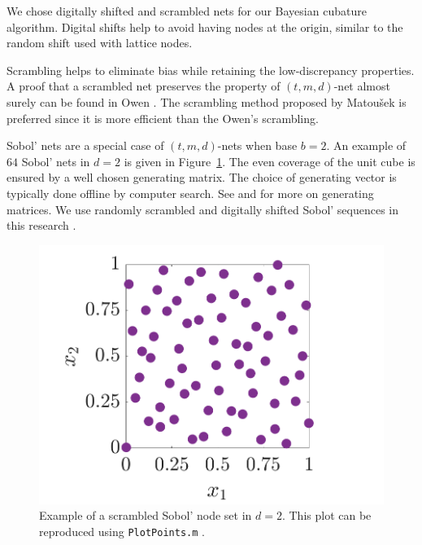 \documentclass{svjour3}                     %
\newcommand{\bm}[1]{\boldsymbol{#1}}
\newcommand{\vx}{\bm{x}}
\newcommand{\vz}{\bm{z}}
\newcommand{\code}[1]{\texttt{#1}}
\newcommand\figref{Figure~\ref}
\newcommand{\JRNote}[1]{{\textcolor{green}{JR: #1}}}
\begin{document}
We chose digitally shifted and scrambled nets \cite{HicYue00} for our Bayesian cubature algorithm. Digital shifts help to avoid having nodes at the origin, similar to the random shift used with lattice nodes.

Scrambling helps to eliminate bias while retaining the low-discrepancy properties.
A proof that a scrambled net preserves the property of $(t, m, d)$-net almost surely can be found in Owen \cite{Owe95}. The scrambling method proposed by Matou\v{s}ek \cite{Mat98} is preferred since it is more efficient than the Owen's scrambling.

Sobol' nets \cite{Sob76} are a special case of $(t,m, d)$-nets when base $b=2$. 
An example of $64$ Sobol' nets in $d=2$ is given in \figref{fig:sobol-fig}.  The even coverage of the unit cube is ensured by a well chosen generating matrix.  The choice of generating vector is typically done offline by computer search.  See \cite{KuoNuyens2016} and \cite{NuySoft} for more on generating matrices. We use randomly scrambled and digitally shifted Sobol' sequences in this research \cite{HonHic00a}. 

\begin{figure}[htp]
	\centering
	\includegraphics[width=0.8\linewidth]{figures/SSobolPoints}
	\caption{Example of a scrambled Sobol' node set  in $d=2$.  This plot can be reproduced using \code{PlotPoints.m} \cite{ChoEtal20a}. \label{sobolfig} }
	\label{fig:sobol-fig}
\end{figure}
\end{document}
